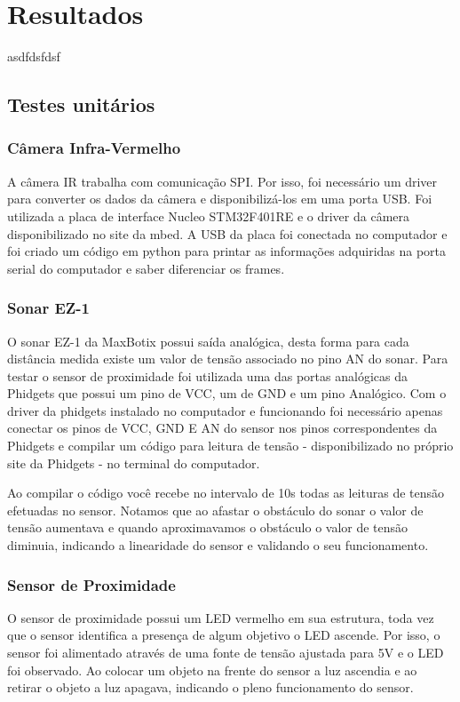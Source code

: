 \chapter{Resultados}
\label{chap:result}
asdfdsfdsf

\section{Testes unitários}
\label{sec:testu}

    \subsection{Câmera Infra-Vermelho}
    
    A câmera IR trabalha com comunicação SPI. Por isso, foi necessário um driver para converter os dados da câmera e disponibilizá-los em uma porta USB. Foi utilizada a placa de interface Nucleo STM32F401RE e o driver da câmera disponibilizado no site da mbed. A USB da placa foi conectada no computador e foi criado um código em python para printar as informações adquiridas na porta serial do computador e saber diferenciar os frames. 
    
    
    \subsection{Sonar EZ-1}
    O sonar EZ-1 da MaxBotix possui saída analógica, desta forma para cada distância medida existe um valor de tensão associado no pino AN do sonar. Para testar o sensor de proximidade foi utilizada uma das portas analógicas da Phidgets que possui um pino de VCC, um de GND e um pino Analógico. Com o driver da phidgets instalado no computador e funcionando foi necessário apenas conectar os pinos de VCC, GND E AN do sensor nos pinos correspondentes da Phidgets e compilar um código para leitura de tensão - disponibilizado no próprio site da Phidgets - no terminal do computador. 
    
    Ao compilar o código você recebe no intervalo de 10s todas as leituras de tensão efetuadas no sensor. Notamos que ao afastar o obstáculo do sonar o valor de tensão aumentava e quando aproximavamos o obstáculo o valor de tensão diminuia, indicando a linearidade do sensor e validando o seu funcionamento.
    
    \subsection{Sensor de Proximidade}
    O sensor de proximidade possui um LED vermelho em sua estrutura, toda vez que o sensor identifica a presença de algum objetivo o LED ascende. Por isso, o sensor foi alimentado através de uma fonte de tensão ajustada para 5V e o LED foi observado. Ao colocar um objeto na frente do sensor a luz ascendia e ao retirar o objeto a luz apagava, indicando o pleno funcionamento do sensor.
    
